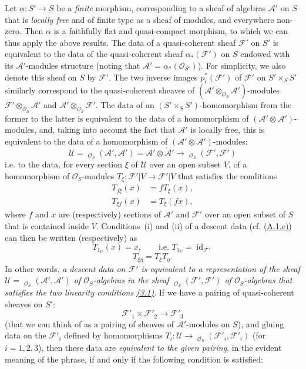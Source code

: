 \documentclass{article}
\newcommand{\scr}[1]{{\mathscr{#1}}}
\renewcommand{\cal}[1]{{\mathcal{#1}}}
\DeclareMathOperator{\id}{id}
\DeclareMathOperator{\Hom}{Hom}
\DeclareMathOperator{\shHom}{\underline{\Hom}}
\newcommand{\oldpage}[1]{\marginpar{\footnotesize$\Big\vert$ \textit{p.~#1}}}
\begin{document}
Let $\alpha\colon S'\to S$ be a \emph{finite} morphism, corresponding to a sheaf of algebras $\scr{A}'$ on $S$ that is \emph{locally free} and of finite type as a sheaf of modules, and everywhere non-zero.
Then $\alpha$ is a faithfully flat and quasi-compact morphism, to which we can thus apply the above results.
The data of a quasi-coherent sheaf $\cal{F}'$ on $S'$ is equivalent to the data of the quasi-coherent sheaf $\alpha_*(\cal{F}')$ on $S$ endowed with its $\scr{A}'$-modules structure (noting that $\scr{A}'=\alpha_*(\scr{O}_{S'})$).
For simplicity, we also denote this sheaf on $S$ by $\cal{F}'$.
The two inverse images $p_i^*(\cal{F}')$ of $\cal{F}'$ on $S'\times_S S'$ similarly correspond to the quasi-coherent sheaves of $(\scr{A}'\otimes_{\scr{O}_S}\scr{A}')$-modules $\cal{F}'\otimes_{\scr{O}_S}\scr{A}'$ and $\scr{A}'\otimes_{\scr{O}_S}\cal{F}'$.
The data of an $(S'\times_S S')$-homomorphism from the former to the latter is equivalent to the data of a homomorphism of $(\scr{A}'\otimes\scr{A}')$-modules, and, taking into account the fact that $\scr{A}'$ is locally free, this is equivalent to the data of a homomorphism of $(\scr{A}'\otimes\scr{A}')$-modules:
\[
  \scr{U}
  = \shHom_{\scr{O}_S}(\scr{A}',\scr{A}')
  = \scr{A}'\otimes\check{\scr{A}}'
  \to \shHom_{\scr{O}_S}(\cal{F}',\cal{F}')
\]
i.e. to the data, for every section $\xi$ of $\scr{U}$ over an open subset $V$, of a homomorphism of $\scr{O}_S$-modules $T_\xi\colon\cal{F}'|V\to\cal{F}'|V$ that satisfies the conditions
\[
\label{equation:B.3.1}
  \begin{aligned}
    T_{f\xi}(x) &= fT_\xi(x),
  \\T_{\xi f}(x) &= T_\xi(fx),
  \end{aligned}
\tag{3.1}
\]
where $f$ and $x$ are (respectively) sections of $\scr{A}'$ and $\cal{F}'$ over an open subset of $S$ that is contained inside $V$.
Conditions~(i) and (ii) of a descent data (cf. \hyperref[A.1.c]{(A.1.c)}) can then be written (respectively) as
\[
\label{equation:B.3.2}
  T_{1_U}(x) = x,
  \qquad\mbox{i.e. $T_{1_U}=\id_{\cal{F}'}$}
\tag{3.2}
\]
\[
\label{equation:B.3.3}
  T_{\xi\eta} = T_\xi T_\eta.
\tag{3.3}
\]
In other words, \emph{a descent data on $\cal{F}'$ is equivalent to a representation of the sheaf $\scr{U}=\shHom_{\scr{O}_S}(\scr{A}',\scr{A}')$ of $\scr{O}_S$-algebras in the sheaf $\shHom_{\scr{O}_S}(\cal{F}',\cal{F}')$ of $\scr{O}_S$-algebras that satisfies the two linearity conditions \hyperref[equation:B.3.1]{(3.1)}}.
If we have a pairing of quasi-coherent sheaves on $S'$:
\[
  \cal{F}'_1\times\cal{F}'_2 \to \cal{F}'_3
\]
(that we can think of as a pairing of sheaves of $\scr{A}'$-modules on $S$),
\oldpage{190-22}
and gluing data on the $\cal{F}'_i$ defined by homomorphisms $T_i\colon\scr{U}\to\shHom_{\scr{O}_S}(\cal{F}'_i,\cal{F}'_i)$ (for $i=1,2,3$), then these data are \emph{equivalent to the given pairing}, in the evident meaning of the phrase, if and only if the following condition is satisfied:
\end{document}
